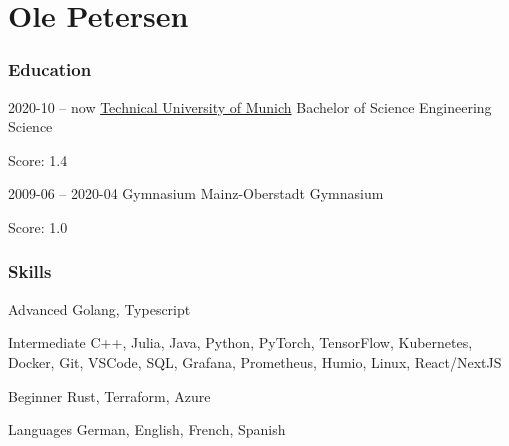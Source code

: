 \documentclass{tccv}
\begin{document}
    
\part{ Ole Petersen }
\section{Education}
\begin{eventlist}


\item{ 2020-10 -- now }
	{ \href{https://www.tum.de/en/studies/degree-programs/detail/engineering-science-bachelor-of-science-bsc}{Technical University of Munich} }
	{ Bachelor of Science Engineering Science}

    Score: 1.4

\item{ 2009-06 -- 2020-04 }
	{ Gymnasium Mainz-Oberstadt }
	{ Gymnasium }

    Score: 1.0


\end{eventlist}
\section{Skills}
\begin{factlist}


\item{ Advanced }
	 { Golang, Typescript }

\item{ Intermediate }
	 { C++, Julia, Java, Python, PyTorch, TensorFlow, Kubernetes, Docker, Git, VSCode, SQL, Grafana, Prometheus, Humio, Linux, React/NextJS }

\item{ Beginner }
	 { Rust, Terraform, Azure }

\item{Languages}
	 { German, English, French, Spanish }

\end{factlist}
\end{document}
